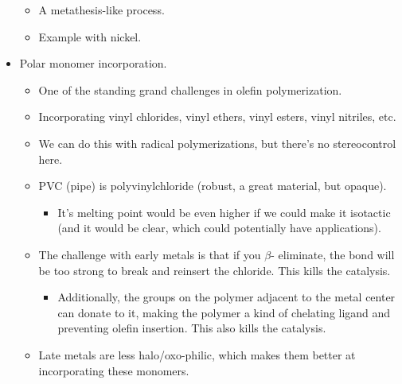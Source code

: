 \documentclass[../notes.tex]{subfiles}
\begin{document}
\begin{itemize}
    \begin{itemize}
        \item A metathesis-like process.
        \item Example with nickel.
    \end{itemize}
    \item Polar monomer incorporation.
    \begin{itemize}
        \item One of the standing grand challenges in olefin polymerization.
        \item Incorporating vinyl chlorides, vinyl ethers, vinyl esters, vinyl nitriles, etc.
        \item We can do this with radical polymerizations, but there's no stereocontrol here.
        \item PVC (pipe) is polyvinylchloride (robust, a great material, but opaque).
        \begin{itemize}
            \item It's melting point would be even higher if we could make it isotactic (and it would be clear, which could potentially have applications).
        \end{itemize}
        \item The challenge with early metals is that if you $\beta$- eliminate, the  bond will be too strong to break and reinsert the chloride. This kills the catalysis.
        \begin{itemize}
            \item Additionally, the groups on the polymer adjacent to the metal center can donate to it, making the polymer a kind of chelating ligand and preventing olefin insertion. This also kills the catalysis.
        \end{itemize}
        \item Late metals are less halo/oxo-philic, which makes them better at incorporating these monomers.
    \end{itemize}
\end{itemize}
\end{document}
